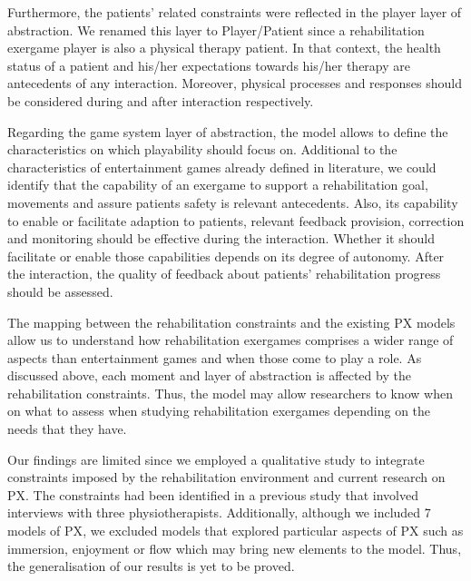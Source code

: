 Furthermore, the patients' related constraints were reflected in the player layer of abstraction. We renamed this layer to Player/Patient since a rehabilitation exergame player is also a physical therapy patient. In that context, the health status of a patient and his/her expectations towards his/her therapy are antecedents of any interaction. Moreover, physical processes and responses should be considered during and after interaction respectively.

Regarding the game system layer of abstraction, the model allows to define the characteristics on which  playability should focus on. Additional to the characteristics of entertainment games already defined in literature, we could identify that the capability of an exergame to support a rehabilitation goal, movements and assure patients safety is relevant antecedents. Also, its capability to enable or facilitate adaption to patients, relevant feedback provision, correction and monitoring should be effective during the interaction. Whether it should facilitate or enable those capabilities depends on its degree of autonomy. After the interaction, the quality of feedback about patients' rehabilitation progress should be assessed.

The mapping between the rehabilitation constraints and the existing \ac{PX} models allow us to understand how rehabilitation exergames comprises a wider range of aspects than entertainment games and when those come to play a role. As discussed above, each moment and layer of abstraction is affected by the rehabilitation constraints. Thus, the model may allow researchers to know when on what to assess when studying rehabilitation exergames depending on the needs that they have.



Our findings are limited since we employed a qualitative study to integrate constraints imposed by the rehabilitation environment and current research on \ac{PX}. The constraints had been identified in a previous study that involved interviews with three physiotherapists. Additionally, although we included 7 models of \ac{PX}, we excluded models that explored particular aspects of \ac{PX} such as immersion, enjoyment or flow which may bring new elements to the model. Thus, the generalisation of our results is yet to be proved.

